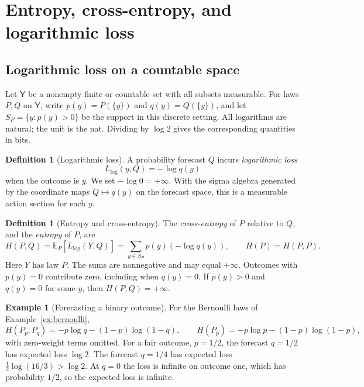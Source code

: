 \documentclass[11pt,oneside]{book}
\theoremstyle{definition}
\newtheorem{definition}[theorem]{Definition}
\newtheorem{example}[theorem]{Example}
\theoremstyle{remark}
\begin{document}
\section{Entropy, cross-entropy, and logarithmic loss}
\label{sec:entropy-log-loss}

\subsection{Logarithmic loss on a countable space}
\label{subsec:discrete-log-loss}

Let $\mathsf Y$ be a nonempty finite or countable set with all subsets
measurable. For laws $P,Q$ on $\mathsf Y$, write $p(y)=P(\{y\})$ and
$q(y)=Q(\{y\})$, and let $S_P=\{y:p(y)>0\}$ be the support in this
discrete setting. All logarithms are natural; the unit is the nat.
Dividing by $\log 2$ gives the corresponding quantities in bits.

\begin{definition}[Logarithmic loss]
\label{def:log-loss}
A probability forecast $Q$ incurs \emph{logarithmic loss}
\[
L_{\log}(y,Q)=-\log q(y)
\]
when the outcome is $y$. We set $-\log 0=+\infty$. With the sigma
algebra generated by the coordinate maps $Q\mapsto q(y)$ on the
forecast space, this is a measurable action section for each $y$.
\end{definition}

\begin{definition}[Entropy and cross-entropy]
\label{def:discrete-entropy-cross-entropy}
The \emph{cross-entropy} of $P$ relative to $Q$, and the \emph{entropy}
of $P$, are
\[
H(P,Q)=\mathbb E_P[L_{\log}(Y,Q)]
=\sum_{y\in S_P}p(y)(-\log q(y)),
\qquad H(P)=H(P,P).
\]
Here $Y$ has law $P$. The sums are nonnegative and may equal $+\infty$.
Outcomes with $p(y)=0$ contribute zero, including when $q(y)=0$.
If $p(y)>0$ and $q(y)=0$ for some $y$, then $H(P,Q)=+\infty$.
\end{definition}

\begin{example}[Forecasting a binary outcome]
\label{ex:bernoulli-cross-entropy}
For the Bernoulli laws of Example~\ref{ex:bernoulli},
\[
H(P_p,P_q)=-p\log q-(1-p)\log(1-q),\qquad
H(P_p)=-p\log p-(1-p)\log(1-p),
\]
with zero-weight terms omitted. For a fair outcome, $p=1/2$, the
forecast $q=1/2$ has expected loss $\log 2$. The forecast $q=1/4$
has expected loss $\tfrac12\log(16/3)>\log 2$. At $q=0$ the loss
is infinite on outcome one, which has probability $1/2$, so the
expected loss is infinite.
\end{example}
\end{document}
